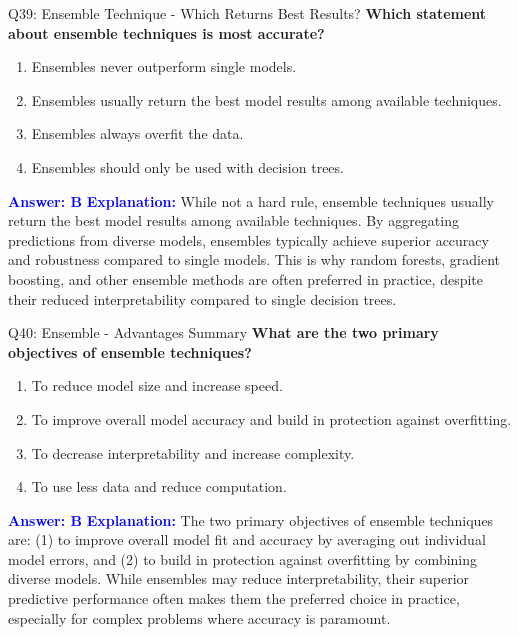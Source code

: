 \documentclass[8pt]{beamer}
\begin{document}
	\begin{frame}{Q39: Ensemble Technique - Which Returns Best Results?}
		\fontsize{6.5}{7.5}\selectfont
		\textbf{Which statement about ensemble techniques is most accurate?}
		\begin{enumerate}
			\item Ensembles never outperform single models.
			\item Ensembles usually return the best model results among available techniques.
			\item Ensembles always overfit the data.
			\item Ensembles should only be used with decision trees.
		\end{enumerate}
		\vspace{0.1cm}
		\textcolor{blue}{\textbf{Answer: B}}
		\vspace{0.1cm}
		\textcolor{blue}{\textbf{Explanation:}} While not a hard rule, ensemble techniques usually return the best model results among available techniques. By aggregating predictions from diverse models, ensembles typically achieve superior accuracy and robustness compared to single models. This is why random forests, gradient boosting, and other ensemble methods are often preferred in practice, despite their reduced interpretability compared to single decision trees.
	\end{frame}
	
	\begin{frame}{Q40: Ensemble - Advantages Summary}
		\fontsize{6.5}{7.5}\selectfont
		\textbf{What are the two primary objectives of ensemble techniques?}
		\begin{enumerate}
			\item To reduce model size and increase speed.
			\item To improve overall model accuracy and build in protection against overfitting.
			\item To decrease interpretability and increase complexity.
			\item To use less data and reduce computation.
		\end{enumerate}
		\vspace{0.1cm}
		\textcolor{blue}{\textbf{Answer: B}}
		\vspace{0.1cm}
		\textcolor{blue}{\textbf{Explanation:}} The two primary objectives of ensemble techniques are: (1) to improve overall model fit and accuracy by averaging out individual model errors, and (2) to build in protection against overfitting by combining diverse models. While ensembles may reduce interpretability, their superior predictive performance often makes them the preferred choice in practice, especially for complex problems where accuracy is paramount.
	\end{frame}
	
\end{document}

